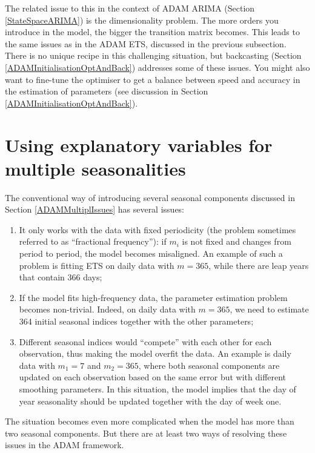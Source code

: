 \documentclass[]{book}
\providecommand{\tightlist}{%
  \setlength{\itemsep}{0pt}\setlength{\parskip}{0pt}}
\theoremstyle{definition}
\theoremstyle{definition}
\theoremstyle{definition}
\theoremstyle{definition}
\theoremstyle{remark}
\begin{document}
The related issue to this in the context of ADAM ARIMA (Section \ref{StateSpaceARIMA}) is the dimensionality problem. The more orders you introduce in the model, the bigger the transition matrix becomes. This leads to the same issues as in the ADAM ETS, discussed in the previous subsection. There is no unique recipe in this challenging situation, but backcasting (Section \ref{ADAMInitialisationOptAndBack}) addresses some of these issues. You might also want to fine-tune the optimiser to get a balance between speed and accuracy in the estimation of parameters (see discussion in Section \ref{ADAMInitialisationOptAndBack}).

\hypertarget{ETSXMultipleSeasonality}{%
\section{Using explanatory variables for multiple seasonalities}\label{ETSXMultipleSeasonality}}

The conventional way of introducing several seasonal components discussed in Section \ref{ADAMMultiplIssues} has several issues:

\begin{enumerate}
\def\labelenumi{\arabic{enumi}.}
\tightlist
\item
  It only works with the data with fixed periodicity (the problem sometimes referred to as ``fractional frequency''): if \(m_i\) is not fixed and changes from period to period, the model becomes misaligned. An example of such a problem is fitting ETS on daily data with \(m=365\), while there are leap years that contain 366 days;
\item
  If the model fits high-frequency data, the parameter estimation problem becomes non-trivial. Indeed, on daily data with \(m=365\), we need to estimate 364 initial seasonal indices together with the other parameters;
\item
  Different seasonal indices would ``compete'' with each other for each observation, thus making the model overfit the data. An example is daily data with \(m_1=7\) and \(m_2=365\), where both seasonal components are updated on each observation based on the same error but with different smoothing parameters. In this situation, the model implies that the day of year seasonality should be updated together with the day of week one.
\end{enumerate}

The situation becomes even more complicated when the model has more than two seasonal components. But there are at least two ways of resolving these issues in the ADAM framework.
\end{document}
